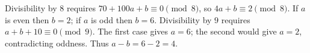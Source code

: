 Divisibility by $8$ requires $70+100a+b\equiv0\pmod8$, so $4a+b\equiv2\pmod8$. If $a$ is even then $b=2$; if $a$ is odd then $b=6$. Divisibility by $9$ requires $a+b+10\equiv0\pmod9$. The first case gives $a=6$; the second would give $a=2$, contradicting oddness. Thus $a-b=6-2=\boxed4$.
